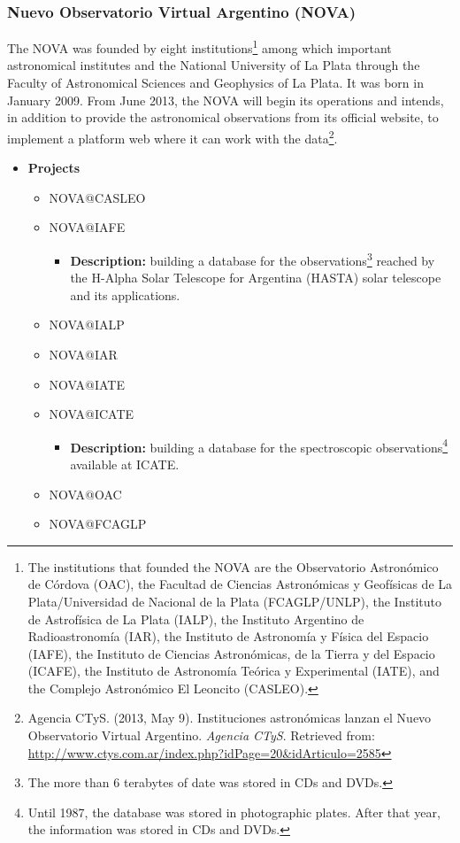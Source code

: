 \subsubsection{Nuevo Observatorio Virtual Argentino (NOVA)}
The NOVA \cite{website:nova-home} was founded by eight institutions\footnote{The
institutions that founded the NOVA are the Observatorio Astron\'{o}mico de
C\'{o}rdova (OAC), the Facultad de Ciencias Astron\'{o}micas y Geof\'{i}sicas de
La Plata/Universidad de Nacional de la Plata (FCAGLP/UNLP), the Instituto de
Astrof\'{i}sica de La Plata (IALP), the Instituto Argentino de
Radioastronom\'{i}a (IAR), the Instituto de Astronom\'{i}a y F\'{i}sica del
Espacio (IAFE), the Instituto de Ciencias Astron\'{o}micas, de la Tierra y del
Espacio (ICAFE), the Instituto de Astronom\'{i}a Te\'{o}rica y Experimental
(IATE), and the Complejo Astron\'{o}mico El Leoncito (CASLEO).} among which
important astronomical institutes and the National University of La Plata
through the Faculty of Astronomical Sciences and Geophysics of La Plata. It was
born in January 2009.  From June 2013, the NOVA will begin its operations and
intends, in addition to provide the astronomical observations from its official
website, to implement a platform web where it can work with the
data\footnote{Agencia CTyS. (2013, May 9). Instituciones astron\'{o}micas lanzan
el Nuevo Observatorio Virtual Argentino. \textit{Agencia CTyS}. Retrieved from:
\url{http://www.ctys.com.ar/index.php?idPage=20&idArticulo=2585}}.

\begin{itemize}
\item \textbf{Projects}
\begin{itemize}
\item NOVA@CASLEO
\item NOVA@IAFE
\begin{itemize}
\item \textbf{Description:} building a database for the
observations\footnote{The more than 6 terabytes of date was stored in CDs and
DVDs.} reached by the H-Alpha Solar Telescope for Argentina (HASTA) solar
telescope and its applications.
\end{itemize}
\item NOVA@IALP
\item NOVA@IAR
\item NOVA@IATE
\item NOVA@ICATE
\begin{itemize}
\item \textbf{Description:} building a database for the spectroscopic
observations\footnote{Until 1987, the database was stored in photographic
plates. After that year, the information was stored in CDs and DVDs.} available
at ICATE.
\end{itemize}
\item NOVA@OAC
\item NOVA@FCAGLP
\end{itemize}
\end{itemize}

